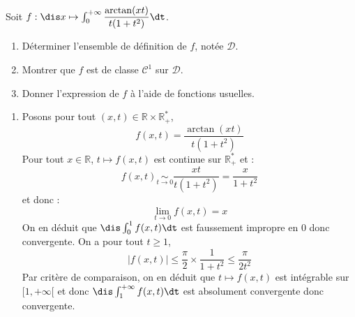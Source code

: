 \documentclass[a4paper,10pt]{report}
\begin{document}
\begin{Exa} Soit $f : \dis x \mapsto \int_{0}^{+ \infty} \dfrac{\arctan(xt)}{t(1+t^2)} \dt$.
\begin{enumerate}
\item Déterminer l'ensemble de définition de $f$, notée $\mathcal{D}$.
\item Montrer que $f$ est de classe $\mathcal{C}^1$ sur $\mathcal{D}$.
\item Donner l'expression de $f$ à l'aide de fonctions usuelles.
\end{enumerate}
\end{Exa}

\corr  
\begin{enumerate}
\item Posons pour tout $(x,t) \in \mathbb{R} \times \mathbb{R}_+^{*}$,
$$ f(x,t) = \dfrac{\arctan(xt)}{t(1+t^2)}$$
Pour tout $x \in \mathbb{R}$, $t \mapsto f(x,t)$ est continue sur $\mathbb{R}_+^{*}$ et :
$$ f(x,t) \underset{ t \rightarrow 0 }{\sim} \dfrac{xt}{t(1+t^2)} = \dfrac{x}{1+t^2}$$
et donc :
$$ \lim_{t \rightarrow 0 } f(x,t) = x$$
On en déduit que $\dis \int_{0}^1 f(x,t) \dt$ est faussement impropre en $0$ donc convergente. On a pour tout $t \geq 1$,
$$ \vert f(x,t) \vert \leq \dfrac{\pi}{2} \times \dfrac{1}{1+t^2} \leq \dfrac{\pi}{2t^2}$$
Par critère de comparaison, on en déduit que $t \mapsto f(x,t)$ est intégrable sur $[1,+ \infty[$ et donc $\dis \int_{1}^{+ \infty} f(x,t) \dt$ est absolument convergente donc convergente.

\medskip


\end{enumerate}
\end{document}

